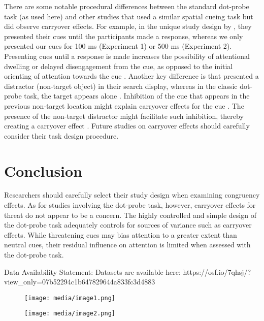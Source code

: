 \documentclass{article}
\begin{document}
There are some notable procedural differences between the standard dot-probe task (as used here) and other studies that used a similar spatial cueing task but did observe carryover effects. For example, in the unique study design by \textcite{Gladwin2019a, Gladwin2020a}, they presented their cues until the participants made a response, whereas we only presented our cues for 100 ms (Experiment 1) or 500 ms (Experiment 2). Presenting cues until a response is made increases the possibility of attentional dwelling or delayed disengagement from the cue, as opposed to the initial orienting of attention towards the cue \parencite{Fox2001}. Another key difference is that \textcite{Gladwin2019a, Gladwin2020a} presented a distractor (non-target object) in their search display, whereas in the classic dot-probe task, the target appears alone \parencite{Mogg1998}. Inhibition of the cue that appears in the previous non-target location might explain carryover effects for the cue \parencite{Gladwin2020a}. The presence of the non-target distractor might facilitate such inhibition, thereby creating a carryover effect \parencite{Gillich2019, Gladwin2019a}. Future studies on carryover effects should carefully consider their task design procedure. 

\section{Conclusion}

Researchers should carefully select their study design when examining congruency effects. As for studies involving the dot-probe task, however, carryover effects for threat do not appear to be a concern. The highly controlled and simple design of the dot-probe task adequately controls for sources of variance such as carryover effects. While threatening cues may bias attention to a greater extent than neutral cues, their residual influence on attention is limited when assessed with the dot-probe task. 

Data Availability Statement:\emph{ }Datasets are available here: https://osf.io/7qhsj/?view\_only=07b52294c1b647829644a833fc3d4883 




\begin{figure}

  \texttt{[image: media/image1.png]}
\caption{}
\label{}


\end{figure}

\begin{figure}

  \texttt{[image: media/image2.png]}
\caption{}
\label{}


\end{figure}
\end{document}
